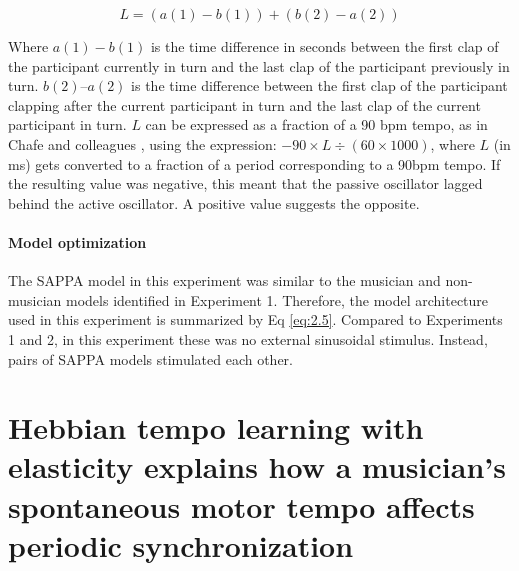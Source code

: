 \documentclass{report}
\begin{document}
\begin{equation}
L = (a(1) - b(1)) + (b(2) - a(2)) \label{eq:2.9}
\end{equation}

Where $a(1)- b(1)$ is the time difference in seconds between the first clap of the participant currently in turn and the last clap of the participant previously in turn. $b(2)–a(2)$ is the time difference between the first clap of the participant clapping after the current participant in turn and the last clap of the current participant in turn. $L$ can be expressed as a fraction of a 90 bpm tempo, as in Chafe and colleagues \cite{chafe2010effect}, using the expression: $- 90 \times L \div (60 \times 1000)$, where $L$ (in ms) gets converted to a fraction of a period corresponding to a 90bpm tempo. If the resulting value was negative, this meant that the passive oscillator lagged behind the active oscillator. A positive value suggests the opposite.

\subsubsection{Model optimization}

The SAPPA model in this experiment was similar to the musician and non-musician models identified in Experiment 1. Therefore, the model architecture used in this experiment is summarized by Eq \eqref{eq:2.5}. Compared to Experiments 1 and 2, in this experiment these was no external sinusoidal stimulus. Instead, pairs of SAPPA models stimulated each other.

\chapter{Hebbian tempo learning with elasticity explains how a musician's spontaneous motor tempo affects periodic synchronization}
\end{document}
